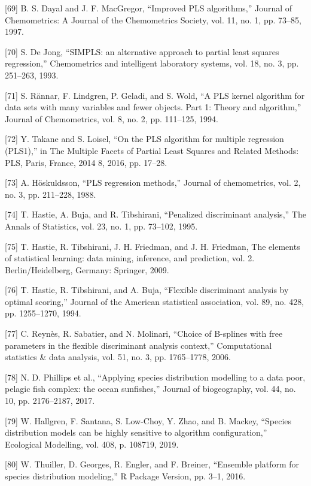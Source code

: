 \documentclass[sn-mathphys-num]{sn-jnl}%
\begin{document}
[69] B. S. Dayal and J. F. MacGregor, “Improved PLS algorithms,” Journal of Chemometrics: A Journal of the Chemometrics Society, vol. 11, no. 1, pp. 73–85, 1997.

[70] S. De Jong, “SIMPLS: an alternative approach to partial least squares regression,” Chemometrics and intelligent laboratory systems, vol. 18, no. 3, pp. 251–263, 1993.

[71] S. Rännar, F. Lindgren, P. Geladi, and S. Wold, “A PLS kernel algorithm for data sets with many variables and fewer objects. Part 1: Theory and algorithm,” Journal of Chemometrics, vol. 8, no. 2, pp. 111–125, 1994.

[72] Y. Takane and S. Loisel, “On the PLS algorithm for multiple regression (PLS1),” in The Multiple Facets of Partial Least Squares and Related Methods: PLS, Paris, France, 2014 8, 2016, pp. 17–28.

[73] A. Höskuldsson, “PLS regression methods,” Journal of chemometrics, vol. 2, no. 3, pp. 211–228, 1988.

[74] T. Hastie, A. Buja, and R. Tibshirani, “Penalized discriminant analysis,” The Annals of Statistics, vol. 23, no. 1, pp. 73–102, 1995.

[75] T. Hastie, R. Tibshirani, J. H. Friedman, and J. H. Friedman, The elements of statistical learning: data mining, inference, and prediction, vol. 2. Berlin/Heidelberg, Germany: Springer, 2009.

[76] T. Hastie, R. Tibshirani, and A. Buja, “Flexible discriminant analysis by optimal scoring,” Journal of the American statistical association, vol. 89, no. 428, pp. 1255–1270, 1994.

[77] C. Reynès, R. Sabatier, and N. Molinari, “Choice of B-splines with free parameters in the flexible discriminant analysis context,” Computational statistics & data analysis, vol. 51, no. 3, pp. 1765–1778, 2006.

[78] N. D. Phillips et al., “Applying species distribution modelling to a data poor, pelagic fish complex: the ocean sunfishes,” Journal of biogeography, vol. 44, no. 10, pp. 2176–2187, 2017.

[79] W. Hallgren, F. Santana, S. Low-Choy, Y. Zhao, and B. Mackey, “Species distribution models can be highly sensitive to algorithm configuration,” Ecological Modelling, vol. 408, p. 108719, 2019.

[80] W. Thuiller, D. Georges, R. Engler, and F. Breiner, “Ensemble platform for species distribution modeling,” R Package Version, pp. 3–1, 2016.
\end{document}
